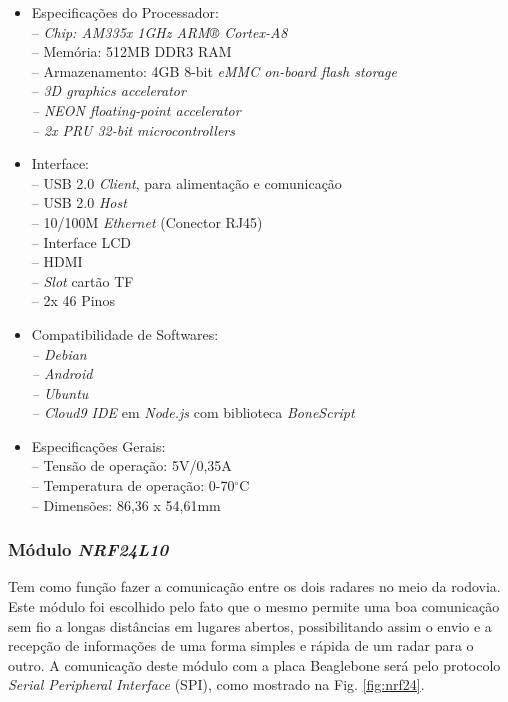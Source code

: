 \begin{itemize}

\item Especificações do Processador:\\
– \emph{Chip: AM335x 1GHz ARM® Cortex-A8}\\
– Memória: 512MB DDR3 RAM\\
– Armazenamento: 4GB 8-bit \emph{eMMC on-board flash storage}\\
– \emph{3D graphics accelerator\\
– NEON \emph{floating-point accelerator}\\
– 2x PRU \emph{32-bit microcontrollers}}

\item Interface:\\
– USB 2.0\emph{ Client}, para alimentação e comunicação\\
– USB 2.0 \emph{Host}\\
– 10/100M\emph{ Ethernet }(Conector RJ45)\\
– Interface LCD\\
– HDMI\\
– \emph{Slot }cartão TF\\
– 2x 46 Pinos

\item  Compatibilidade de Softwares:\\
\emph{– Debian\\
– Android\\
– Ubuntu\\
– Cloud9 IDE} em \emph{Node.js} com biblioteca \emph{BoneScript}

\item  Especificações Gerais:\\
– Tensão de operação: 5V/0,35A\\
– Temperatura de operação: 0-70$^{\circ}$C\\
– Dimensões: 86,36 x 54,61mm
    
\end{itemize}
 \subsubsection{Módulo \emph{NRF24L10}} 

Tem como função fazer a comunicação entre os dois radares no meio da rodovia. Este módulo foi escolhido pelo fato que o mesmo permite uma boa comunicação sem fio a longas distâncias em lugares abertos, possibilitando assim o envio e a recepção de informações de uma forma simples e rápida de um radar para o outro. A comunicação deste módulo com a placa Beaglebone será pelo protocolo \emph{Serial Peripheral Interface} (SPI), como mostrado na Fig. \ref{fig:nrf24}. 

